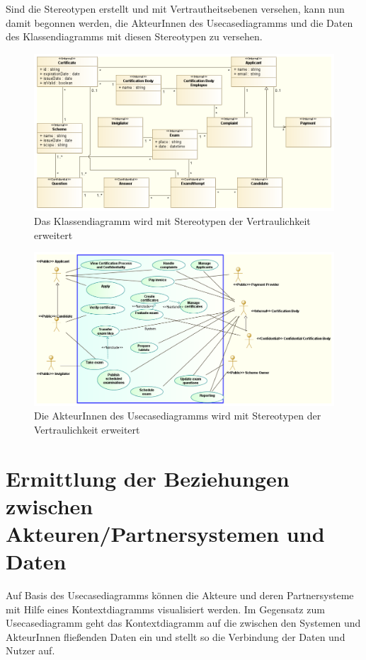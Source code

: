 Sind die Stereotypen erstellt und mit Vertrautheitsebenen versehen, kann nun damit begonnen werden, die AkteurInnen des Usecasediagramms und die Daten des Klassendiagramms mit diesen Stereotypen zu versehen.

\begin{figure}[H]
    \centering
    \includegraphics[scale=0.5]{uml/classstereotyped.png}
    \caption{Das Klassendiagramm wird mit Stereotypen der Vertraulichkeit erweitert}
\end{figure}

\begin{figure}[H]
    \centering
    \includegraphics[scale=0.4]{uml/stereotypedusecase.png}
    \caption{Die AkteurInnen des Usecasediagramms wird mit Stereotypen der Vertraulichkeit erweitert}
\end{figure}

\section{Ermittlung der Beziehungen zwischen Akteuren/Partnersystemen und Daten}
Auf Basis des Usecasediagramms können die Akteure und deren Partnersysteme mit Hilfe eines Kontextdiagramms visualisiert werden. Im Gegensatz zum Usecasediagramm geht das Kontextdiagramm auf die zwischen den Systemen und AkteurInnen fließenden Daten ein und stellt so die Verbindung der Daten und Nutzer auf.


